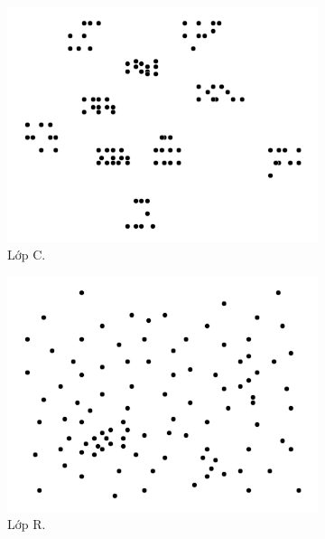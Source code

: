 \begin{figure}[H] %
	\label{fig:perf_ct_c1}
	\begin{subfigure}{.3\textwidth}
		\centering
		\includegraphics[width=1\linewidth]{figures/cls_c.png}
		\caption{Lớp C.}
		\label{fig:cls_c}
	\end{subfigure}%
	\begin{subfigure}{.3\textwidth}
		\centering
		\includegraphics[width=1\linewidth]{figures/cls_r.png}
		\caption{Lớp R.}
		\label{fig:cls_r}
	\end{subfigure}
	\begin{subfigure}{.3\textwidth}
		\centering

\end{subfigure}
\end{figure}
